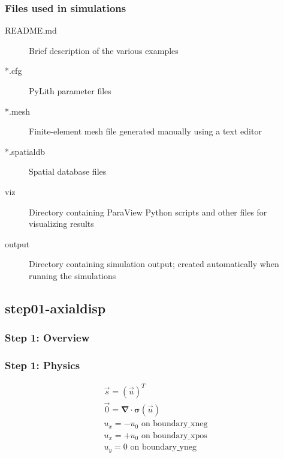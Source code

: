 \documentclass[aspectratio=169]{beamer}
\begin{document}
\begin{frame}
  \frametitle{Files used in simulations}

  \begin{description}
  \item[README.md] Brief description of the various examples
  \item[*.cfg] PyLith parameter files
  \item[*.mesh] Finite-element mesh file generated manually using a text editor
  \item[*.spatialdb] Spatial database files
  \item[viz] Directory containing ParaView Python scripts and other files for visualizing results
  \item[output] Directory containing simulation output; created automatically when running the simulations
  \end{description}

\end{frame}
  

\subsection{step01-axialdisp}

\begin{frame}
  \frametitle{Step 1: Overview}

      
\end{frame}


\begin{frame}
  \frametitle{Step 1: Physics}
  \summary{}

  \begin{minipage}{0.35\textwidth}
    {\scriptsize
    \begin{gather*}
      \vec{s} = \left( \vec{u} \right)^T \\
      \vec{0} = \boldsymbol{\nabla} \cdot \boldsymbol{\sigma}(\vec{u}) \\
      u_x = -u_0 \text{ on boundary\_xneg} \\
      u_x = +u_0 \text{ on boundary\_xpos} \\
      u_y = 0 \text{ on boundary\_yneg}
    \end{gather*}}
  \end{minipage}
  \hfill
  \begin{minipage}{0.55\textwidth}
  \end{minipage}
      
\end{frame}
\end{document}
